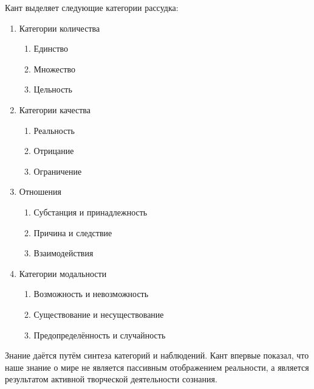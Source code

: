 \documentclass[12pt]{article}
\begin{document}
Кант выделяет следующие категории рассудка:
\begin{enumerate}
\item Категории количества
    \begin{enumerate}
        \item Единство
        \item Множество
        \item Цельность
    \end{enumerate}
    
\item Категории качества
    \begin{enumerate}
        \item Реальность
        \item Отрицание
        \item Ограничение
    \end{enumerate}
\item Отношения
    \begin{enumerate}
        \item Субстанция и принадлежность
        \item Причина и следствие
        \item Взаимодействия
    \end{enumerate}
\item Категории модальности
    \begin{enumerate}
        \item Возможность и невозможность
        \item Существование и несуществование
        \item Предопределённость и случайность
    \end{enumerate}
\end{enumerate}

Знание даётся путём синтеза категорий и наблюдений. Кант впервые показал, что наше знание о мире не
является  пассивным  отображением  реальности,  а  является  результатом  активной  творческой  деятельности
сознания.

\newpage
\end{document}
